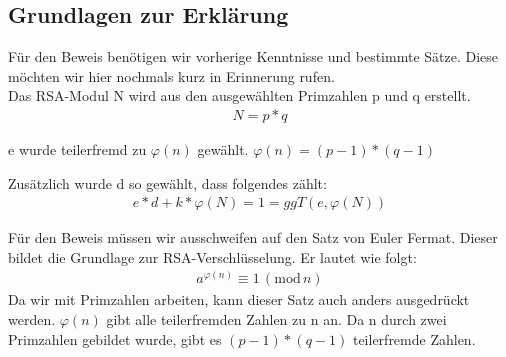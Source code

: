 \subsection{Grundlagen zur Erklärung}
Für den Beweis benötigen wir vorherige Kenntnisse und bestimmte Sätze. Diese möchten wir hier nochmals kurz in Erinnerung rufen.\\ 
Das RSA-Modul N wird aus den ausgewählten Primzahlen p und q erstellt.
\begin{align}
  N = p * q
\end{align}

e wurde teilerfremd zu $ \varphi(n) $ gewählt. 
$ \varphi(n) = (p-1)*(q-1) $

Zusätzlich wurde d so gewählt, dass folgendes zählt:
\begin{align}
 e * d + k * \varphi(N) = 1 = ggT(e,\varphi(N))
\end{align}

Für den Beweis müssen wir ausschweifen auf den Satz von Euler Fermat. Dieser bildet die Grundlage zur RSA-Verschlüsselung. Er lautet wie folgt:
\begin{align}
	a^{\varphi(n)} \equiv 1\,(\mathrm{mod}\,n)
\end{align}
Da wir mit Primzahlen arbeiten, kann dieser Satz auch anders ausgedrückt werden. $ \varphi(n) $ gibt alle teilerfremden Zahlen zu n an. Da n durch zwei Primzahlen gebildet wurde, gibt es $ (p-1)*(q-1) $ teilerfremde Zahlen. 

